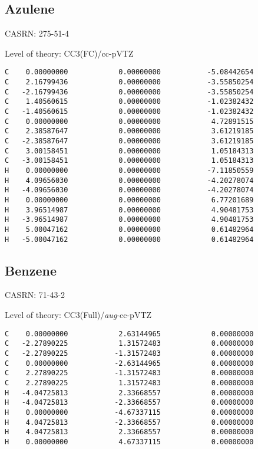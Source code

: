 \documentclass[journal=jctcce,manuscript=article,layout=traditional]{achemso}
\newcommand{\TZ}{cc-pVTZ}
\newcommand{\AVTZ}{\emph{aug}-cc-pVTZ}
\begin{document}
\subsection{Azulene}

CASRN: 275-51-4

\begin{singlespace}
\noindent Level of theory: CC3(FC)/{\TZ}
\begin{verbatim}
C    0.00000000            0.00000000           -5.08442654
C    2.16799436            0.00000000           -3.55850254
C   -2.16799436            0.00000000           -3.55850254
C    1.40560615            0.00000000           -1.02382432
C   -1.40560615            0.00000000           -1.02382432
C    0.00000000            0.00000000            4.72891515
C    2.38587647            0.00000000            3.61219185
C   -2.38587647            0.00000000            3.61219185
C    3.00158451            0.00000000            1.05184313
C   -3.00158451            0.00000000            1.05184313
H    0.00000000            0.00000000           -7.11850559
H    4.09656030            0.00000000           -4.20278074
H   -4.09656030            0.00000000           -4.20278074
H    0.00000000            0.00000000            6.77201689
H    3.96514987            0.00000000            4.90481753
H   -3.96514987            0.00000000            4.90481753
H    5.00047162            0.00000000            0.61482964
H   -5.00047162            0.00000000            0.61482964
\end{verbatim}
\end{singlespace}

\subsection{Benzene}

CASRN: 71-43-2

\begin{singlespace}
\noindent Level of theory: CC3(Full)/{\AVTZ}
\begin{verbatim}
C    0.00000000            2.63144965            0.00000000
C   -2.27890225            1.31572483            0.00000000
C   -2.27890225           -1.31572483            0.00000000
C    0.00000000           -2.63144965            0.00000000
C    2.27890225           -1.31572483            0.00000000
C    2.27890225            1.31572483            0.00000000
H   -4.04725813            2.33668557            0.00000000
H   -4.04725813           -2.33668557            0.00000000
H    0.00000000           -4.67337115            0.00000000
H    4.04725813           -2.33668557            0.00000000
H    4.04725813            2.33668557            0.00000000
H    0.00000000            4.67337115            0.00000000
\end{verbatim}
\end{singlespace}
\end{document}
